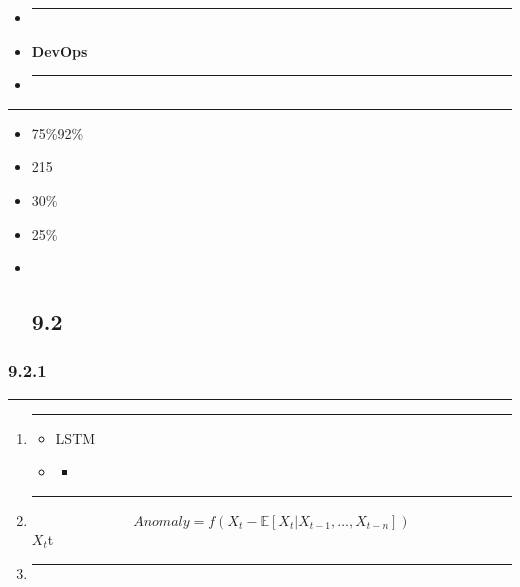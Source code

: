 \begin{itemize}
\item
  \begin{center}\rule{0.5\linewidth}{0.5pt}\end{center}
\item
  \textbf{DevOps}
\item
  \begin{center}\rule{0.5\linewidth}{0.5pt}\end{center}
\end{itemize}

\begin{center}\rule{0.5\linewidth}{0.5pt}\end{center}

\begin{itemize}
\item
  75\%92\%
\item
  215
\item
  30\%
\item
  25\%
\item ~
  \subsection{9.2}\label{section-7}
\end{itemize}

\subsubsection{9.2.1}\label{section-8}

\begin{center}\rule{0.5\linewidth}{0.5pt}\end{center}

\begin{enumerate}
\def\labelenumi{\arabic{enumi}.}
\item
  \begin{center}\rule{0.5\linewidth}{0.5pt}\end{center}

  \begin{itemize}
  \tightlist
  \item
    LSTM
  \item
    \begin{itemize}
    \tightlist
    \item
    \end{itemize}
  \end{itemize}
\item
  \begin{center}\rule{0.5\linewidth}{0.5pt}\end{center}

  \[Anomaly = f(X_t - \mathbb{E}[X_t|X_{t-1}, ..., X_{t-n}])\] \(X_t\)t
\item
  \begin{center}\rule{0.5\linewidth}{0.5pt}\end{center}
\end{enumerate}

